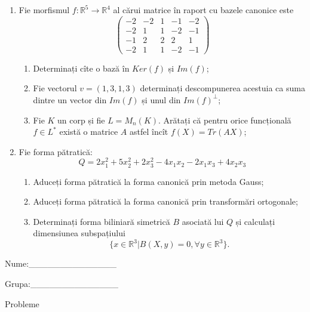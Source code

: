 \documentclass{article}
\begin{document}
\begin{enumerate}
 \item Fie morfismul $f:\mathbb{R}^5 \to \mathbb{R}^4$ al cărui matrice în raport cu bazele canonice este
$$\begin{pmatrix}
-2&-2&1&-1&-2\\
-2&1&1&-2&-1\\
-1&2&2&2&1\\
-2&1&1&-2&-1
\end{pmatrix}$$

\begin{enumerate}
\item Determinați cîte o bază în $Ker(f)$ și $Im(f)$;
\item Fie vectorul $v=(1,3,1,3)$ determinați descompunerea acestuia ca suma dintre un vector din $Im(f)$ și unul din $Im(f)^\perp$;
\item Fie $K$ un corp și fie $L=M_n(K)$. Arătați că pentru orice funcțională $f \in L^*$ există o matrice $A$ astfel încît $f(X)=Tr(AX)$;
\end{enumerate}
\item Fie forma pătratică:
$$Q= 2x_1^2+5x_2^2+2x_3^2-4x_1x_2-2x_1x_3+4x_2x_3$$

\begin{enumerate}
\item Aduceți forma pătratică la forma canonică prin metoda Gauss;
\item Aduceți forma pătratică la forma canonică prin transformări ortogonale;
\item Determinați forma biliniară simetrică $B$ asociată lui $Q$ și calculați dimensiunea subspațiului
$$\{x \in \mathbb{R}^3 | B(X,y)=0,\forall y \in \mathbb{R}^3\}.$$

\end{enumerate}
\end{enumerate}
\newpage
\begin{flushright}
Nume:\_\_\_\_\_\_\_\_\_\_\_\_\_\_
 
 
Grupa:\_\_\_\_\_\_\_\_\_\_\_\_\_\_
\end{flushright}
\begin{center}
\vspace{2cm}
{\Large Probleme}
\vspace{2cm}
\end{center}
\end{document}

